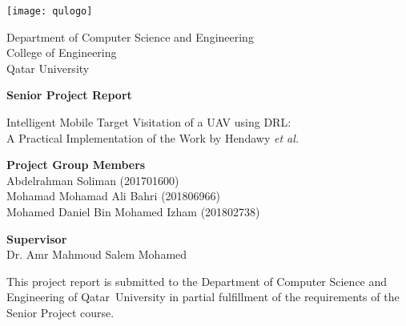 \documentclass[../main.tex]{subfiles}
\begin{document}
\nolinenumbers



        \centering
        \texttt{[image: qulogo]}

        \Large
        Department of Computer Science and Engineering\\
        College of Engineering\\
        Qatar University\\

        \vspace{2.5cm}

        \Huge
        \textbf{Senior Project Report}

        \vspace{1.0cm}
        \Large
        Intelligent Mobile Target Visitation of a UAV using DRL:\\
        A Practical Implementation of the Work by Hendawy \textit{et al.}

        \vspace{2.5cm}

        \raggedright
        \large
        \textbf{Project Group Members}\\
        \normalsize
        \medskip
        \-\hspace{0.5cm} Abdelrahman Soliman (201701600)\\
        \-\hspace{0.5cm} Mohamad Mohamad Ali Bahri (201806966)\\
        \-\hspace{0.5cm} Mohamed Daniel Bin Mohamed Izham (201802738)\\

        \vspace{1.0cm}

        \large
        \textbf{Supervisor}\\
        \normalsize
        \medskip
        \-\hspace{0.5cm} Dr. Amr Mahmoud Salem Mohamed\\

        \vfill

        \small

        \raggedright
        This project report is submitted to the Department
        of Computer Science and Engineering of Qatar~University 
        in partial fulfillment of the
        requirements of the Senior Project course.

        \vspace{0.8cm}
\end{document}
